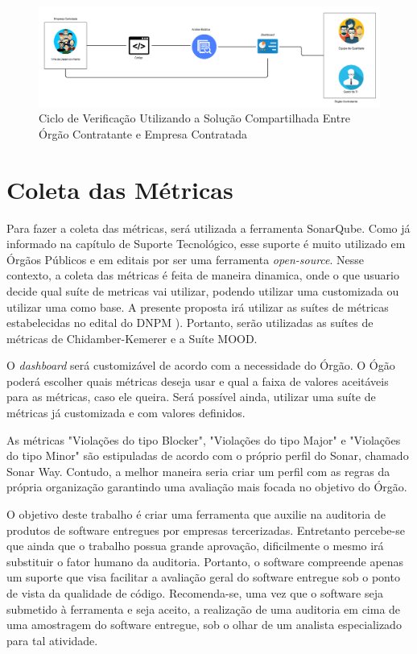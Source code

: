 \graphicspath{{figuras/}}
\begin{figure}[h!]
\centering
\includegraphics[scale=0.30]{proc_ver.png}
\caption{Ciclo de Verificação Utilizando a Solução Compartilhada Entre Órgão Contratante e Empresa Contratada}
\label{img:ciclo_ver}
\end{figure}


\section{Coleta das Métricas}
Para fazer a coleta das métricas, será utilizada a ferramenta SonarQube. Como já informado na capítulo de Suporte Tecnológico, esse suporte é muito utilizado em Órgãos Públicos e em editais por ser uma ferramenta \textit{open-source}. Nesse contexto, a coleta das métricas é feita de maneira dinamica, onde o que usuario decide qual suíte de metricas vai utilizar, podendo utilizar uma customizada ou utilizar uma como base. A presente proposta irá utilizar as suítes de métricas estabelecidas no edital do DNPM \cite{edital}). Portanto, serão utilizadas as suítes de métricas de Chidamber-Kemerer e a Suíte MOOD.

O \textit{dashboard} será customizável de acordo com a necessidade do Órgão. O Ógão poderá escolher quais métricas deseja usar e qual a faixa de valores aceitáveis para as métricas, caso ele queira. Será possível ainda, utilizar uma suíte de métricas já customizada e com valores definidos. 

As métricas "Violações do tipo Blocker", "Violações do tipo Major" e "Violações do tipo Minor" são estipuladas de acordo com o próprio perfil do Sonar, chamado Sonar Way. Contudo, a melhor maneira seria criar um perfil com as regras da própria organização garantindo uma avaliação mais focada no objetivo do Órgão.

O objetivo deste trabalho é criar uma ferramenta que auxilie na auditoria de produtos de software entregues por empresas tercerizadas. Entretanto percebe-se que ainda que o trabalho possua grande aprovação, dificilmente o mesmo irá substituir o fator humano da auditoria. Portanto, o software compreende apenas um suporte que visa facilitar a avaliação geral do software entregue sob o ponto de vista da qualidade de código. Recomenda-se, uma vez que o software seja submetido à ferramenta e seja aceito, a realização de uma auditoria em cima de uma amostragem do software entregue, sob o olhar de um analista especializado para tal atividade.

